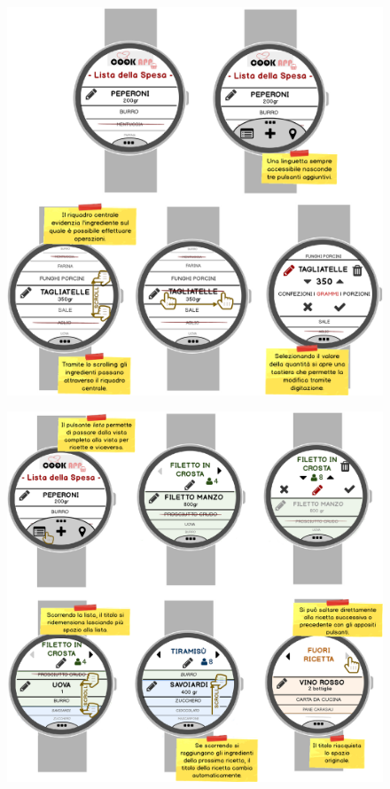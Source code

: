 \begin{itemize}
\begin{figure}[H]
	\centering
	\includegraphics[width=0.95\linewidth]{img/mockup/zmart.png}
\end{figure}
\begin{figure}[H]
	\centering
	\includegraphics[width=0.95\linewidth]{img/mockup/zmart-vista-ricetta.png}

\end{figure}
\end{itemize}
